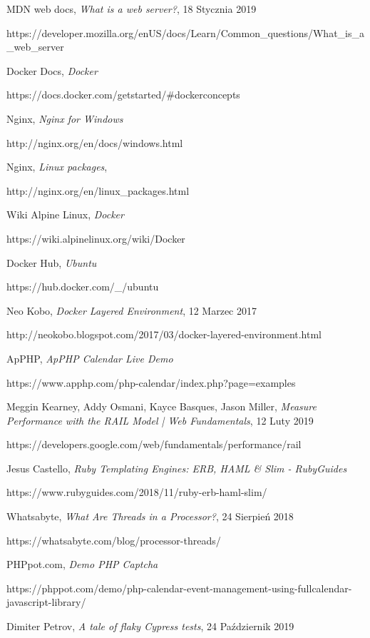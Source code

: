 \begin{thebibliography}{99}
MDN web docs,
\textit{What is a web server?},
18 Stycznia 2019

https://developer.mozilla.org/en\-US/docs/Learn/Common\_questions/What\_is\_a\_web\_server

Docker Docs,
\textit{Docker}

https://docs.docker.com/get\-started/\#docker\-concepts

Nginx,
\textit{Nginx for Windows}

http://nginx.org/en/docs/windows.html

Nginx, 
\textit{Linux packages},

http://nginx.org/en/linux\_packages.html

Wiki Alpine Linux, 
\textit{Docker}

https://wiki.alpinelinux.org/wiki/Docker

Docker Hub,
\textit{Ubuntu}

https://hub.docker.com/\_/ubuntu

Neo Kobo,
\textit{Docker Layered Environment},
12 Marzec 2017

http://neokobo.blogspot.com/2017/03/docker-layered-environment.html

ApPHP,
\textit{ApPHP Calendar Live Demo}

https://www.apphp.com/php-calendar/index.php?page=examples

Meggin Kearney, Addy Osmani, Kayce Basques, Jason Miller,
\textit{Measure Performance with the RAIL Model | Web Fundamentals},
12 Luty 2019

https://developers.google.com/web/fundamentals/performance/rail

Jesus Castello, 
\textit{Ruby Templating Engines: ERB, HAML \& Slim - RubyGuides}

https://www.rubyguides.com/2018/11/ruby-erb-haml-slim/

Whatsabyte,
\textit{What Are Threads in a Processor?},
24 Sierpień 2018

https://whatsabyte.com/blog/processor-threads/

PHPpot.com,
\textit{Demo PHP Captcha}

https://phppot.com/demo/php-calendar-event-management-using-fullcalendar-javascript-library/

Dimiter Petrov,
\textit{A tale of flaky Cypress tests},
24 Październik 2019


\end{thebibliography}
